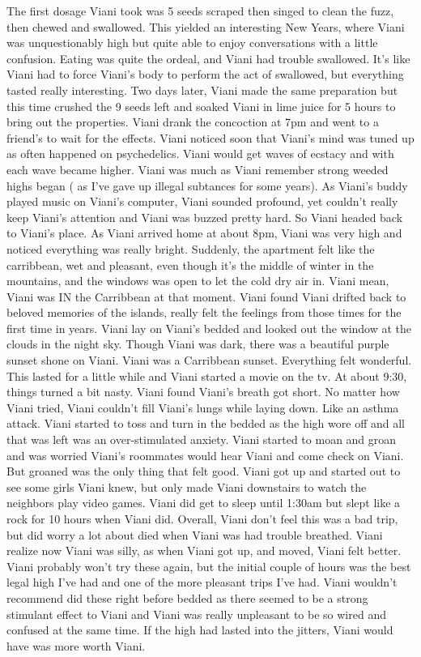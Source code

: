 \documentclass[12pt]{book}
\begin{document}
The first dosage Viani took was 5 seeds scraped then singed to clean the fuzz, then chewed and swallowed. This yielded an interesting New Years, where Viani was unquestionably high but quite able to enjoy conversations with a little confusion. Eating was quite the ordeal, and Viani had trouble swallowed. It's like Viani had to force Viani's body to perform the act of swallowed, but everything tasted really interesting. Two days later, Viani made the same preparation but this time crushed the 9 seeds left and soaked Viani in lime juice for 5 hours to bring out the properties. Viani drank the concoction at 7pm and went to a friend's to wait for the effects. Viani noticed soon that Viani's mind was tuned up as often happened on psychedelics. Viani would get waves of ecstacy and with each wave became higher. Viani was much as Viani remember strong weeded highs began ( as I've gave up illegal subtances for some years). As Viani's buddy played music on Viani's computer, Viani sounded profound, yet couldn't really keep Viani's attention and Viani was buzzed pretty hard. So Viani headed back to Viani's place. As Viani arrived home at about 8pm, Viani was very high and noticed everything was really bright. Suddenly, the apartment felt like the carribbean, wet and pleasant, even though it's the middle of winter in the mountains, and the windows was open to let the cold dry air in. Viani mean, Viani was IN the Carribbean at that moment. Viani found Viani drifted back to beloved memories of the islands, really felt the feelings from those times for the first time in years. Viani lay on Viani's bedded and looked out the window at the clouds in the night sky. Though Viani was dark, there was a beautiful purple sunset shone on Viani. Viani was a Carribbean sunset. Everything felt wonderful. This lasted for a little while and Viani started a movie on the tv. At about 9:30, things turned a bit nasty. Viani found Viani's breath got short. No matter how Viani tried, Viani couldn't fill Viani's lungs while laying down. Like an asthma attack. Viani started to toss and turn in the bedded as the high wore off and all that was left was an over-stimulated anxiety. Viani started to moan and groan and was worried Viani's roommates would hear Viani and come check on Viani. But groaned was the only thing that felt good. Viani got up and started out to see some girls Viani knew, but only made Viani downstairs to watch the neighbors play video games. Viani did get to sleep until 1:30am but slept like a rock for 10 hours when Viani did. Overall, Viani don't feel this was a bad trip, but did worry a lot about died when Viani was had trouble breathed. Viani realize now Viani was silly, as when Viani got up, and moved, Viani felt better. Viani probably won't try these again, but the initial couple of hours was the best legal high I've had and one of the more pleasant trips I've had. Viani wouldn't recommend did these right before bedded as there seemed to be a strong stimulant effect to Viani and Viani was really unpleasant to be so wired and confused at the same time. If the high had lasted into the jitters, Viani would have was more worth Viani.
\end{document}
